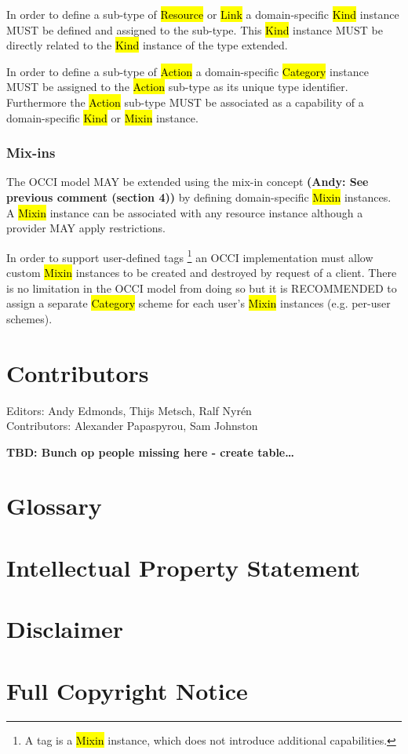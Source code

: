 \documentclass[10pt,a4paper]{article}
\begin{document}
In order to define a sub-type of \hl{Resource} or \hl{Link} a domain-specific
\hl{Kind} instance MUST be defined and assigned to the sub-type. This
\hl{Kind} instance MUST be directly related to the \hl{Kind} instance of the
type extended.

In order to define a sub-type of \hl{Action} a domain-specific \hl{Category}
instance MUST be assigned to the \hl{Action} sub-type as its unique type identifier.
Furthermore the \hl{Action} sub-type MUST be associated as a capability of a
domain-specific \hl{Kind} or \hl{Mixin} instance.

\subsubsection{Mix-ins}
The OCCI model MAY be extended using the mix-in concept \textbf{(Andy: See previous comment (section 4))} by defining
domain-specific \hl{Mixin} instances.  A \hl{Mixin} instance can be associated
with any resource instance although a provider MAY apply restrictions.

In order to support user-defined tags \footnote{A tag is a \hl{Mixin} instance, 
which does not introduce additional capabilities.} an OCCI implementation must allow custom
\hl{Mixin} instances to be created and destroyed by request of a client.
There is no limitation in the OCCI model from doing so but it is RECOMMENDED to
assign a separate \hl{Category} scheme for each user's \hl{Mixin} instances (e.g. per-user schemes).

\section{Contributors}
Editors: Andy Edmonds, Thijs Metsch, Ralf Nyrén \\
Contributors: Alexander Papaspyrou, Sam Johnston

\textbf{TBD: Bunch op people missing here - create table\ldots}

\section{Glossary}
\label{sec:glossary}



\section{Intellectual Property Statement}


\section{Disclaimer}


\section{Full Copyright Notice}




\end{document}
